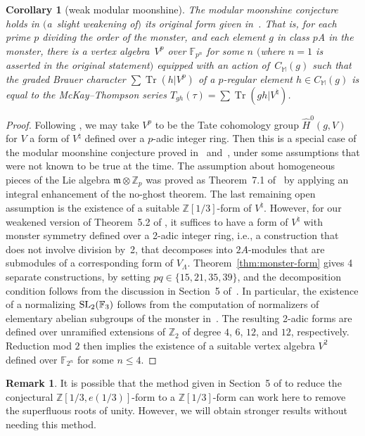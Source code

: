 \documentclass[pdftex]{sigma}
\newcommand{\bF}{\mathbb{F}}
\newcommand{\bM}{\mathbb{M}}
\newcommand{\bZ}{\mathbb{Z}}
\newcommand{\fm}{\mathfrak{m}}
\DeclareMathOperator{\Tr}{Tr}
\newtheorem{cor}[thm]{Corollary}
\theoremstyle{definition}
\newtheorem{rem}[thm]{Remark}
\begin{document}
\begin{cor}[weak modular moonshine]\label{cor:weak-modular-moonshine}
The modular moonshine conjecture holds in \linebreak $($a~slight weakening of$)$ its original form given in~{\rm \cite{R96}}. That is, for each prime $p$ dividing the order of the monster, and each element $g$ in class $p$A in the monster, there is a vertex algebra~$V^p$ over $\bF_{p^n}$ for some $n$ $($where $n=1$ is asserted in the original statement$)$ equipped with an action of~$C_\bM(g)$ such that the graded Brauer character $\sum \Tr(h|V^p)$ of a $p$-regular element $h \in C_\bM(g)$ is equal to the McKay--Thompson series $T_{gh}(\tau) = \sum \Tr(gh|V^\natural)$.
\end{cor}
\begin{proof}Following \cite{BR96}, we may take $V^p$ to be the Tate cohomology group $\hat{H}^0(g,V)$ for $V$ a form of $V^\natural$ defined over a $p$-adic integer ring. Then this is a special case of the modular moonshine conjecture proved in~\cite{BR96} and~\cite{B98}, under some assumptions that were not known to be true at the time. The assumption about homogeneous pieces of the Lie algebra $\fm \otimes \bZ_p$ was proved as Theorem~7.1 of~\cite{B99} by applying an integral enhancement of the no-ghost theorem. The last remaining open assumption is the existence of a suitable $\bZ[1/3]$-form of $V^\natural$. However, for our weakened version of Theorem~5.2 of \cite{BR96}, it suffices to have a form of $V^\natural$ with monster symmetry defined over a 2-adic integer ring, i.e., a construction that does not involve division by~2, that decomposes into $2A$-modules that are submodules of a corresponding form of $V_\Lambda$. Theorem~\ref{thm:monster-form} gives 4 separate constructions, by setting $pq \in \{ 15, 21, 35, 39 \}$, and the decomposition condition follows from the discussion in Section~5 of~\cite{BR96}. In particular, the existence of a normalizing ${\rm SL}_2(\bF_3)$ follows from the computation of normalizers of elementary abelian subgroups of the monster in~\cite{W88}. The resulting 2-adic forms are defined over unramified extensions of $\bZ_2$ of degree $4$, $6$, $12$, and $12$, respectively. Reduction mod $2$ then implies the existence of a suitable vertex algebra $V^2$ defined over $\bF_{2^n}$ for some $n \leq 4$.
\end{proof}

\begin{rem}It is possible that the method given in Section~5 of \cite{BR96} to reduce the conjectural $\bZ[1/3,e(1/3)]$-form to a $\bZ[1/3]$-form can work here to remove the superfluous roots of unity. However, we will obtain stronger results without needing this method.
\end{rem}
\end{document}

